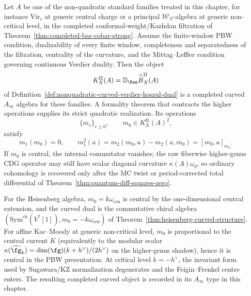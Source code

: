 \begin{proposition}
\label{prop:curved-completed-koszul-critical-boundary}
Let $A$ be one of the non-quadratic standard families treated in this
chapter, for instance $\mathrm{Vir}_c$ at generic central charge or a
principal $\mathcal W_N$-algebra at generic non-critical level, in the
completed conformal-weight/Kazhdan filtration of
Theorem~\ref{thm:completed-bar-cobar-strong}. Assume the finite-window
PBW condition, dualizability of every finite window, completeness and
separatedness of the filtration, centrality of the curvature, and the
Mittag--Leffler condition governing continuous Verdier duality. Then
the object
\[
K_X^{\mathrm{II}}(A)
=
\mathbb D_{\Ran}\widehat{\bar B}^{\mathrm{II}}_X(A)
\]
of Definition~\ref{def:nonquadratic-curved-verdier-koszul-dual}
is a completed curved \(A_\infty\) algebra for these families.  A
formality theorem that contracts the higher operations supplies its
strict quadratic realization. Its operations
\[
\{m_r\}_{r\ge0},\qquad m_0\in K_X^{\mathrm{II}}(A)^2,
\]
satisfy
\[
m_1(m_0)=0,\qquad
m_1^2(a)=m_2(m_0,a)-m_2(a,m_0)=[m_0,a]_{m_2}.
\]
If $m_0$ is central, the internal commutator vanishes; the raw
fiberwise higher-genus CDG operator may still have scalar diagonal
curvature $\kappa(A)\omega_g$, so ordinary cohomology is recovered
only after the MC twist or period-corrected total differential of
Theorem~\ref{thm:quantum-diff-squares-zero}.

For the Heisenberg algebra, $m_0=k\omega_{\mathrm{cen}}$ is central by
the one-dimensional central extension, and the curved dual is the
commutative chiral algebra
$(\mathrm{Sym}^{\mathrm{ch}}(V^*[1]),m_0=-k\omega_{\mathrm{cen}})$ of
Theorem~\ref{thm:heisenberg-curved-structure}. For affine
Kac--Moody at generic non-critical level,
$m_0$ is proportional to the central current $K$ (equivalently to the
modular scalar
$\kappa(\widehat{\fg}_k)=\dim(\fg)(k+h^\vee)/(2h^\vee)$ on the
higher-genus shadow), hence it is central in the PBW presentation.
At critical level \(k=-h^\vee\), the invariant form used by
Sugawara/KZ normalization degenerates and the Feigin--Frenkel centre
enters.  The resulting completed curved object is recorded in its
\(A_\infty\) type in this chapter.
\end{proposition}

